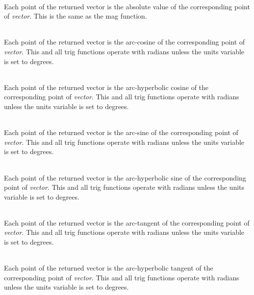 \begin{description}
\item{}\\
Each point of the returned vector is the absolute value of the
corresponding point of {\it vector\/}.  This is the same as the {\vt
mag} function.

\item{}\\
Each point of the returned vector is the arc-cosine of the
corresponding point of {\it vector\/}.  This and all trig functions
operate with radians unless the {\et units} variable is set to {\vt
degrees}.

\item{}\\
Each point of the returned vector is the arc-hyperbolic cosine of the
corresponding point of {\it vector\/}.  This and all trig functions
operate with radians unless the {\et units} variable is set to {\vt
degrees}.

\item{}\\
Each point of the returned vector is the arc-sine of the
corresponding point of {\it vector\/}.  This and all trig functions
operate with radians unless the {\et units} variable is set to {\vt
degrees}.

\item{}\\
Each point of the returned vector is the arc-hyperbolic sine of the
corresponding point of {\it vector\/}.  This and all trig functions
operate with radians unless the {\et units} variable is set to {\vt
degrees}.

\item{}\\
Each point of the returned vector is the arc-tangent of the
corresponding point of {\it vector\/}.  This and all trig functions
operate with radians unless the {\et units} variable is set to {\vt
degrees}.

\item{}\\
Each point of the returned vector is the arc-hyperbolic tangent of the
corresponding point of {\it vector\/}.  This and all trig functions
operate with radians unless the {\et units} variable is set to {\vt
degrees}.


\end{description}
